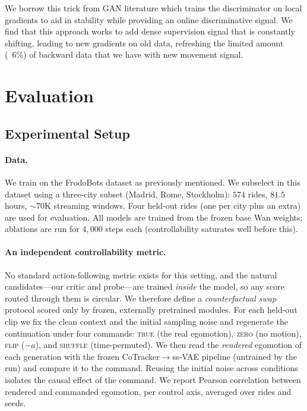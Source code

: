 \documentclass[letterpaper]{article} %
\begin{document}
We borrow this trick from GAN literature which trains the discriminator on local gradients to aid in stability while providing an online discriminative signal. We find that this approach works to add dense supervision signal that is constantly shifting, leading to new gradients on old data, refreshing the limited amount (~6\%) of backward data that we have with new movement signal.

\section{Evaluation}

\subsection{Experimental Setup}
\paragraph{Data.} We train on the FrodoBots dataset as previously mentioned. We subselect in this dataset using a three-city subset (Madrid, Rome, Stockholm): $574$ rides, $81.5$ hours, $\sim\!70$K streaming windows. Four held-out rides (one per city plus an extra) are used for evaluation. All models are trained from the frozen base Wan weights; ablations are run for $4{,}000$ steps each (controllability saturates well before this).

\paragraph{An independent controllability metric.} No standard action-following metric exists for this setting, and the natural candidates---our critic and probe---are trained \emph{inside} the model, so any score routed through them is circular. We therefore define a \emph{counterfactual swap} protocol scored only by frozen, externally pretrained modules. For each held-out clip we fix the clean context and the initial sampling noise and regenerate the continuation under four commands: \textsc{true} (the real egomotion), \textsc{zero} (no motion), \textsc{flip} ($-a$), and \textsc{shuffle} (time-permuted). We then read the \emph{rendered} egomotion of each generation with the frozen CoTracker$\rightarrow$ss-VAE pipeline (untrained by the run) and compare it to the command. Reusing the initial noise across conditions isolates the causal effect of the command. We report Pearson correlation between rendered and commanded egomotion, per control axis, averaged over rides and seeds.
\end{document}
